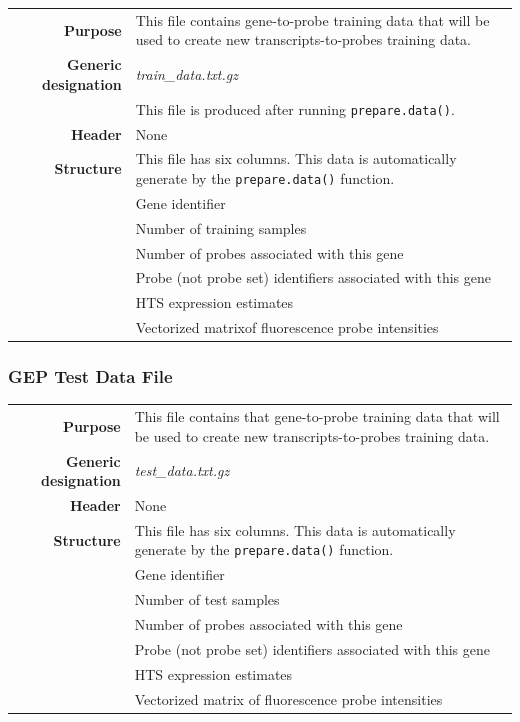 \documentclass[a4paper,12pt]{article}
\begin{document}
\begin{tabular}{rp{12cm}}
\textbf{Purpose} & This file contains gene-to-probe training data that will be used to create new transcripts-to-probes training data. \\
\textbf{Generic designation} & \textit{train\_data.txt.gz} \\
  & This file is produced after running \texttt{prepare.data()}. \\
\textbf{Header} & None \\
\textbf{Structure} & This file has six columns. This data is automatically generate by the \texttt{prepare.data()} function. \\
  & Gene identifier \\
  & Number of training samples \\
  & Number of probes associated with this gene \\
  & Probe (not probe set) identifiers associated with this gene \\
  & HTS expression estimates \\
  & Vectorized matrix\footnotemark[1] of fluorescence probe intensities \\
\end{tabular}

\subsubsection{GEP Test Data File}
\label{tiep:gep_test}

\begin{tabular}{rp{12cm}}
\textbf{Purpose} & This file contains that gene-to-probe training data that will be used to create new transcripts-to-probes training data. \\
\textbf{Generic designation} & \textit{test\_data.txt.gz} \\
\textbf{Header} & None \\
\textbf{Structure} & This file has six columns. This data is automatically generate by the \texttt{prepare.data()} function. \\
  & Gene identifier \\
  & Number of test samples \\
  & Number of probes associated with this gene \\
  & Probe (not probe set) identifiers associated with this gene \\
  & HTS expression estimates \\
  & Vectorized matrix of fluorescence probe intensities
\end{tabular}
\end{document}
